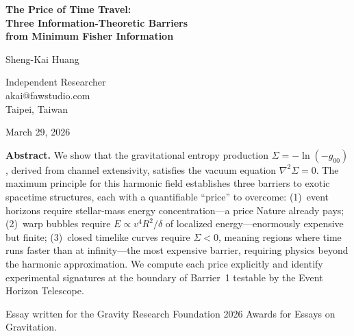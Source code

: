 \documentclass[12pt]{article}
\renewcommand{\baselinestretch}{2.0}
\begin{document}
\begin{titlepage}
\renewcommand{\baselinestretch}{1.0}\selectfont
\begin{center}

\vspace*{1cm}

{\LARGE \textbf{The Price of Time Travel:\\[6pt]
Three Information-Theoretic Barriers\\[6pt]
from Minimum Fisher Information}}

\vspace{1.2cm}

{\large Sheng-Kai Huang}

\vspace{0.4cm}

Independent Researcher\\
akai@fawstudio.com\\
Taipei, Taiwan

\vspace{0.8cm}

March 29, 2026

\vspace{1.2cm}

\begin{minipage}{0.85\textwidth}
\textbf{Abstract.}
We show that the gravitational entropy production
$\Sigma = -\ln(-g_{00})$, derived from channel extensivity,
satisfies the vacuum equation $\nabla^2\Sigma = 0$.
The maximum principle for this harmonic field establishes three
barriers to exotic spacetime structures, each with a quantifiable
``price'' to overcome:
(1)~event horizons require stellar-mass energy concentration---a price
Nature already pays;
(2)~warp bubbles require $E \propto v^4 R^2/\delta$ of localized
energy---enormously expensive but finite;
(3)~closed timelike curves require $\Sigma < 0$, meaning regions where
time runs faster than at infinity---the most expensive barrier, requiring
physics beyond the harmonic approximation.
We compute each price explicitly and identify experimental signatures
at the boundary of Barrier~1 testable by the Event Horizon Telescope.
\end{minipage}

\vspace{1.2cm}

Essay written for the Gravity Research Foundation 2026 Awards for Essays on Gravitation.

\end{center}
\renewcommand{\baselinestretch}{2.0}\selectfont
\end{titlepage}
\end{document}
